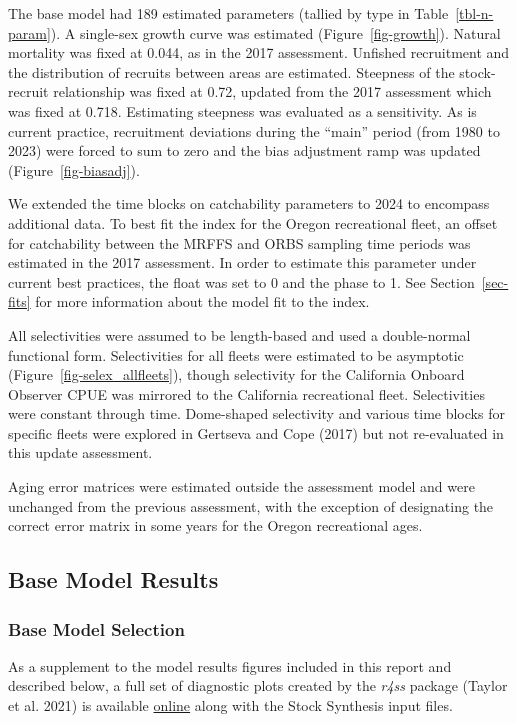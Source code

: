 \documentclass[
]{scrartcl}
\begin{document}
The base model had 189 estimated parameters (tallied by type in
Table~\ref{tbl-n-param}). A single-sex growth curve was estimated
(Figure~\ref{fig-growth}). Natural mortality was fixed at 0.044, as in
the 2017 assessment. Unfished recruitment and the distribution of
recruits between areas are estimated. Steepness of the stock-recruit
relationship was fixed at 0.72, updated from the 2017 assessment which
was fixed at 0.718. Estimating steepness was evaluated as a sensitivity.
As is current practice, recruitment deviations during the ``main''
period (from 1980 to 2023) were forced to sum to zero and the bias
adjustment ramp was updated (Figure~\ref{fig-biasadj}).

We extended the time blocks on catchability parameters to 2024 to
encompass additional data. To best fit the index for the Oregon
recreational fleet, an offset for catchability between the MRFFS and
ORBS sampling time periods was estimated in the 2017 assessment. In
order to estimate this parameter under current best practices, the float
was set to 0 and the phase to 1. See Section~\ref{sec-fits} for more
information about the model fit to the index.

All selectivities were assumed to be length-based and used a
double-normal functional form. Selectivities for all fleets were
estimated to be asymptotic (Figure~\ref{fig-selex_allfleets}), though
selectivity for the California Onboard Observer CPUE was mirrored to the
California recreational fleet. Selectivities were constant through time.
Dome-shaped selectivity and various time blocks for specific fleets were
explored in Gertseva and Cope (2017) but not re-evaluated in this update
assessment.

Aging error matrices were estimated outside the assessment model and
were unchanged from the previous assessment, with the exception of
designating the correct error matrix in some years for the Oregon
recreational ages.

\subsection{Base Model Results}\label{base-model-results}

\subsubsection{Base Model Selection}\label{base-model-selection}

As a supplement to the model results figures included in this report and
described below, a full set of diagnostic plots created by the
\emph{r4ss} package (Taylor et al. 2021) is available
\href{https://github.com/rclairer/Sebastes_ruberrimus_2025}{online}
along with the Stock Synthesis input files.
\end{document}
